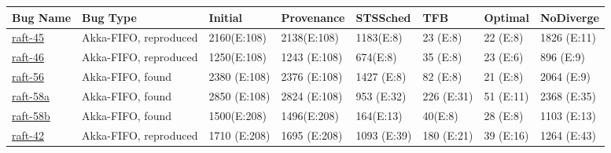 

\begin{table*}
\begin{adjustwidth}{-1.2cm}{}
{
\centering
\footnotesize
\begin{tabular}{|l|l|l|l|l|l||l||l|}
  \cline{1-8}
  \textbf{Bug Name} & \textbf{Bug Type} &
  \textbf{Initial} & \textbf{Provenance} &
  \textbf{STSSched} & \textbf{TFB} & \textbf{Optimal} & \textbf{NoDiverge} \\\cline{1-7} \hline
\href{https://docs.google.com/document/d/1alldH4lRSpFQ55-YCNFaIcMpjxrBOMNaB7R_9eEVwfs}{raft-45}
& Akka-FIFO, reproduced
& 2160\hfill (E:108) & 2138\hfill (E:108) & 1183\hfill (E:8) & 23 \hfill (E:8)
& 22 \hfill (E:8) & 1826 \hfill (E:11) \\

\href{https://docs.google.com/document/d/1vhGftMIlmm_uFLmCz2GI0CCPmttDUR617hJ72k2BTbY}{raft-46}
& Akka-FIFO, reproduced
& 1250\hfill (E:108) & 1243 \hfill (E:108) & 674\hfill (E:8) & 35 \hfill (E:8)
& 23 \hfill (E:6) & 896 \hfill (E:9) \\

\href{https://docs.google.com/document/d/1_UPKhjYoSrG9p4FQXqML_WQKa3WNbM2fch2aa0V-9Go}{raft-56}
& Akka-FIFO, found
& 2380 \hfill (E:108) & 2376 \hfill (E:108) & 1427 \hfill (E:8) & 82 \hfill
(E:8) & 21 \hfill (E:8) & 2064 \hfill (E:9) \\

\href{https://docs.google.com/document/d/1_efq5rbOGCG3sG-2qxbbOeIRztW9XYP6xgyh0QFmWXg}{raft-58a}
& Akka-FIFO, found
& 2850 \hfill (E:108) & 2824 \hfill (E:108) & 953 \hfill (E:32) & 226 \hfill
(E:31) & 51 \hfill (E:11) & 2368 \hfill (E:35) \\

\href{https://docs.google.com/document/d/1eERBdohTC3UidHJ6cZq12ixpp_eiVqzT7LvzuTeEtR4}{raft-58b}
& Akka-FIFO, found
& 1500\hfill (E:208) & 1496\hfill (E:208) & 164\hfill (E:13) & 40\hfill (E:8)
& 28 \hfill (E:8) & 1103 \hfill (E:13) \\

\href{https://docs.google.com/document/d/1BN4hpTKtN_-inqyT5XTGogI8QSlohnP2Y7A01nuW7TI}{raft-42}
& Akka-FIFO, reproduced
& 1710 \hfill (E:208) & 1695 \hfill (E:208) & 1093 \hfill (E:39) & 180 \hfill
(E:21) & 39 \hfill (E:16) & 1264 \hfill (E:43) \\


\end{tabular}}
\end{adjustwidth}
\end{table*}

